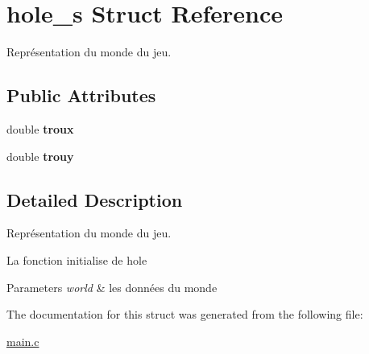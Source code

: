 \hypertarget{structhole__s}{\section{hole\-\_\-s Struct Reference}
\label{structhole__s}
}


Représentation du monde du jeu.  


\subsection*{Public Attributes}
\begin{DoxyCompactItemize}
\item 
\hypertarget{structhole__s_a797d6e7e437f73feee937e9db1607710}{double {\bfseries troux}}\label{structhole__s_a797d6e7e437f73feee937e9db1607710}

\item 
\hypertarget{structhole__s_a1324778aea13703d99a6d325e9d8af84}{double {\bfseries trouy}}\label{structhole__s_a1324778aea13703d99a6d325e9d8af84}

\end{DoxyCompactItemize}


\subsection{Detailed Description}
Représentation du monde du jeu. 

La fonction initialise de hole 
\begin{DoxyParams}{Parameters}
{\em world} & les données du monde \\
\hline
\end{DoxyParams}


The documentation for this struct was generated from the following file\-:\begin{DoxyCompactItemize}
\item 
\hyperlink{main_8c}{main.\-c}\end{DoxyCompactItemize}
